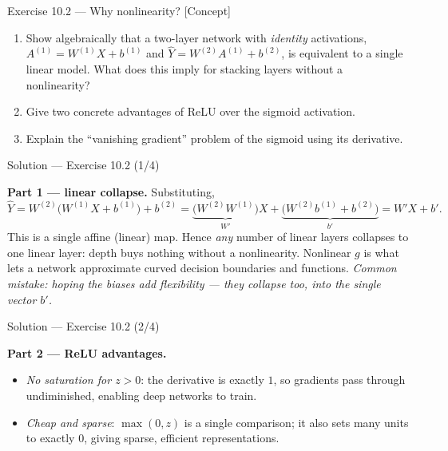 \documentclass[aspectratio=169,11pt]{beamer}
\begin{document}
\begin{frame}{Exercise 10.2 --- Why nonlinearity? [Concept]}
\begin{exercise}
  \begin{enumerate}
    \item Show algebraically that a two-layer network with
          \emph{identity} activations,
          $A^{(1)} = W^{(1)} X + b^{(1)}$ and
          $\hat Y = W^{(2)} A^{(1)} + b^{(2)}$, is equivalent to a
          single linear model. What does this imply for stacking
          layers without a nonlinearity?
    \item Give two concrete advantages of ReLU over the sigmoid
          activation.
    \item Explain the ``vanishing gradient'' problem of the sigmoid
          using its derivative.
  \end{enumerate}
\end{exercise}
\end{frame}

\begin{frame}{Solution --- Exercise 10.2 (1/4)}
\begin{solutionbox}
  \textbf{Part 1 --- linear collapse.} Substituting,
  \[
    \hat Y = W^{(2)}\big(W^{(1)} X + b^{(1)}\big) + b^{(2)}
           = \underbrace{\big(W^{(2)} W^{(1)}\big)}_{W'} X
             + \underbrace{\big(W^{(2)} b^{(1)} + b^{(2)}\big)}_{b'}
           = W' X + b' .
  \]
  This is a single affine (linear) map. Hence \emph{any} number of
  linear layers collapses to one linear layer: depth buys nothing
  without a nonlinearity. Nonlinear $g$ is what lets a network
  approximate curved decision boundaries and functions.
  \textit{Common mistake: hoping the biases add flexibility --- they
  collapse too, into the single vector $b'$.}
\end{solutionbox}
\end{frame}

\begin{frame}{Solution --- Exercise 10.2 (2/4)}
\begin{solutionbox}
  \medskip
  \textbf{Part 2 --- ReLU advantages.}
  \begin{itemize}
    \item \emph{No saturation for $z > 0$}: the derivative is exactly
          $1$, so gradients pass through undiminished, enabling deep
          networks to train.
    \item \emph{Cheap and sparse}: $\max(0, z)$ is a single
          comparison; it also sets many units to exactly $0$, giving
          sparse, efficient representations.
  \end{itemize}
\end{solutionbox}
\end{frame}
\end{document}
